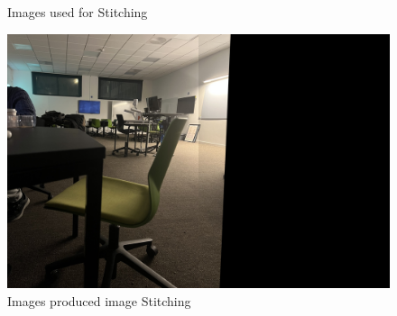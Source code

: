 \documentclass{article}
\begin{document}
    \begin{figure}[H]
        \centering
        \quad
        \caption{Images used for Stitching}
        \label{fig:originalStitch}
    \end{figure}
    \begin{figure}[H]
        \centering
        \includegraphics[width=1\textwidth]{output.jpg}
        \caption{Images produced image Stitching}
        \label{fig:stiched}
    \end{figure}
\end{document}
